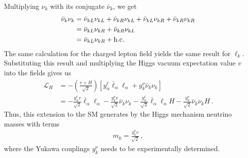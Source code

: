 Multiplying $\nu_k$ with its conjugate $\bar{\nu}_k$, we get 
\begin{align}
    \bar{\nu}_k \nu_k 
    & = \bar{\nu}_{k L} \nu_{k L} +\bar{\nu}_{k R}\nu_{k L} + \bar{\nu}_{k L}\nu_{k R} + \bar{\nu}_{k R}\nu_{k R} \nonumber \\
    & = \bar{\nu}_{k L}\nu_{k R} + \bar{\nu}_{k R}\nu_{k L} \nonumber \\
    & = \bar{\nu}_{k L}\nu_{k R} + \text{{h.c.}}
\end{align}
The same calculation for the charged lepton field yields the same result for $\ell_k$. Substituting this result and multiplying the Higgs vacuum expectation value $v$ into the fields gives us
\begin{align}
    \mathcal{L}_{H} 
    &=-\left( \frac{v + H}{\sqrt{2}} \right) \left[ y_{\alpha}^{\ell}   \bar{\ell}_\alpha \ell_\alpha  +  y_{k}^{\nu} \bar{\nu}_k \nu_k \right] \nonumber \\
    &=- \frac{y_{\alpha}^{\ell} v}{\sqrt{2}}   \bar{\ell}_\alpha \ell_\alpha   -  \frac{ y_{k}^{\nu} v}{\sqrt{2}} \bar{\nu}_k \nu_k  - \frac{y_{\alpha}^{\ell}}{\sqrt{2}}   \bar{\ell}_\alpha \ell_\alpha H  -  \frac{ y_{k}^{\nu}}{\sqrt{2}} \bar{\nu}_k \nu_k H\,.
\end{align}
Thus, this extension to the SM generates by the Higgs mechanism neutrino masses with terms
\begin{align}
    m_k = \frac{y_k^\nu v}{\sqrt{2}}\,,
\end{align}
where the Yukawa couplings $y^\nu_k$ needs to be experimentally determined.